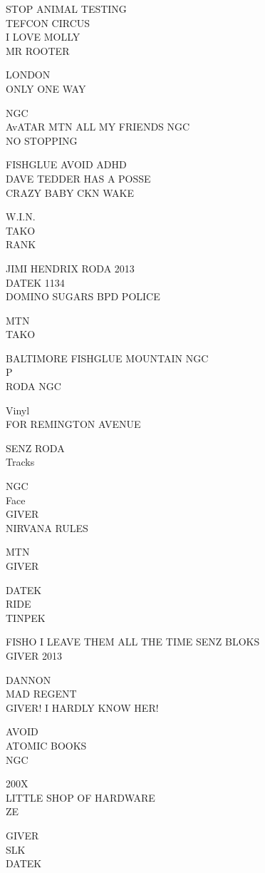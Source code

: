 \documentclass[10pt,letterpaper]{article}
\begin{document}
STOP ANIMAL TESTING\\
TEFCON CIRCUS\\
I LOVE MOLLY\\
MR ROOTER

LONDON\\
ONLY ONE WAY

NGC\\
AvATAR MTN ALL MY FRIENDS NGC\\
NO STOPPING

FISHGLUE AVOID ADHD\\
DAVE TEDDER HAS A POSSE\\
CRAZY BABY CKN WAKE

W.I.N.\\
TAKO\\
RANK

JIMI HENDRIX RODA 2013\\
DATEK 1134\\
DOMINO SUGARS BPD POLICE

MTN\\
TAKO

BALTIMORE FISHGLUE MOUNTAIN NGC\\
P\\
RODA NGC

Vinyl\\
FOR REMINGTON AVENUE

SENZ RODA\\
Tracks

NGC\\
Face\\
GIVER\\
NIRVANA RULES

MTN\\
GIVER

DATEK\\
RIDE\\
TINPEK

FISHO I LEAVE THEM ALL THE TIME SENZ BLOKS\\
GIVER 2013

DANNON\\
MAD REGENT\\
GIVER!  I HARDLY KNOW HER!

AVOID\\
ATOMIC BOOKS\\
NGC

200X\\
LITTLE SHOP OF HARDWARE\\
ZE

GIVER\\
SLK\\
DATEK
\end{document}
